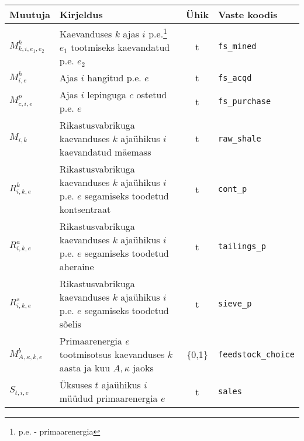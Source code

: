 \begin{landscape}
\begin{table}
\begin{tabular}{l l c l}
Muutuja & Kirjeldus & Ühik & Vaste koodis\\
\hline
$M^k_{k,i,e_1, e_2}$ & Kaevanduses $k$ ajas $i$ p.e.\footnote{p.e. - primaarenergia} $e_1$ tootmiseks kaevandatud p.e. $e_2$ & t &  \texttt{fs\_mined}\\
$M^h_{i,e}$ & Ajas $i$ hangitud p.e. $e$ & t &  \texttt{fs\_acqd}\\
$M^p_{c,i,e}$ & Ajas $i$ lepinguga $c$ ostetud p.e. $e$ & t &  \texttt{fs\_purchase}\\

$M_{i,k}$ & Rikastusvabrikuga kaevanduses $k$ ajaühikus $i$ kaevandatud mäemass & t & \texttt{raw\_shale}\\

$R^k_{i,k,e}$& Rikastusvabrikuga kaevanduses $k$ ajaühikus $i$ p.e. $e$ segamiseks toodetud kontsentraat & t & \texttt{cont\_p}\\
$R^a_{i,k,e}$& Rikastusvabrikuga kaevanduses $k$ ajaühikus $i$ p.e. $e$ segamiseks toodetud aheraine & t & \texttt{tailings\_p}\\
$R^s_{i,k,e}$& Rikastusvabrikuga kaevanduses $k$ ajaühikus $i$ p.e. $e$ segamiseks toodetud sõelis & t & \texttt{sieve\_p}\\
$M^b_{A, \kappa, k,e}$ & Primaarenergia $e$ tootmisotsus kaevanduses $k$ aasta ja kuu $A,\kappa$  jaoks &  \{0,1\} & \texttt{feedstock\_choice}\\
$S_{t,i,e}$ & Üksuses $t$ ajaühikus $i$ müüdud primaarenergia $e$ & t & \texttt{sales}\\


\end{tabular}
\end{table}
\end{landscape}
